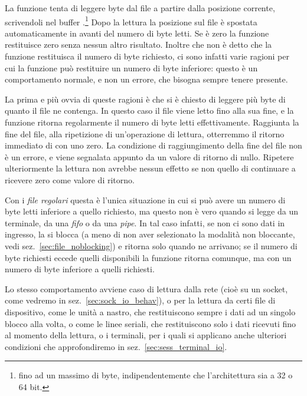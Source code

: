 La funzione tenta di leggere  byte dal file  a partire
dalla posizione corrente, scrivendoli nel buffer .\footnote{fino ad
  un massimo di  byte, indipendentemente che l'architettura
  sia a 32 o 64 bit.} Dopo la lettura la posizione sul file è spostata
automaticamente in avanti del numero di byte letti. Se  è zero la
funzione restituisce zero senza nessun altro risultato. Inoltre che non è
detto che la funzione  restituisca il numero di byte richiesto, ci
sono infatti varie ragioni per cui la funzione può restituire un numero di
byte inferiore: questo è un comportamento normale, e non un errore, che
bisogna sempre tenere presente.

La prima e più ovvia di queste ragioni è che si è chiesto di leggere più byte
di quanto il file ne contenga. In questo caso il file viene letto fino alla
sua fine, e la funzione ritorna regolarmente il numero di byte letti
effettivamente. Raggiunta la fine del file, alla ripetizione di un'operazione
di lettura, otterremmo il ritorno immediato di  con uno zero.  La
condizione di raggiungimento della fine del file non è un errore, e viene
segnalata appunto da un valore di ritorno di  nullo. Ripetere
ulteriormente la lettura non avrebbe nessun effetto se non quello di
continuare a ricevere zero come valore di ritorno.

Con i \textsl{file regolari} questa è l'unica situazione in cui si può avere
un numero di byte letti inferiore a quello richiesto, ma questo non è vero
quando si legge da un terminale, da una \textit{fifo} o da una
\textit{pipe}. In tal caso infatti, se non ci sono dati in ingresso, la
 si blocca (a meno di non aver selezionato la modalità non
bloccante, vedi sez.~\ref{sec:file_noblocking}) e ritorna solo quando ne
arrivano; se il numero di byte richiesti eccede quelli disponibili la funzione
ritorna comunque, ma con un numero di byte inferiore a quelli richiesti.

Lo stesso comportamento avviene caso di lettura dalla rete (cioè su un socket,
come vedremo in sez.~\ref{sec:sock_io_behav}), o per la lettura da certi file
di dispositivo, come le unità a nastro, che restituiscono sempre i dati ad un
singolo blocco alla volta, o come le linee seriali, che restituiscono solo i
dati ricevuti fino al momento della lettura, o i terminali, per i quali si
applicano anche ulteriori condizioni che approfondiremo in
sez.~\ref{sec:sess_terminal_io}.

